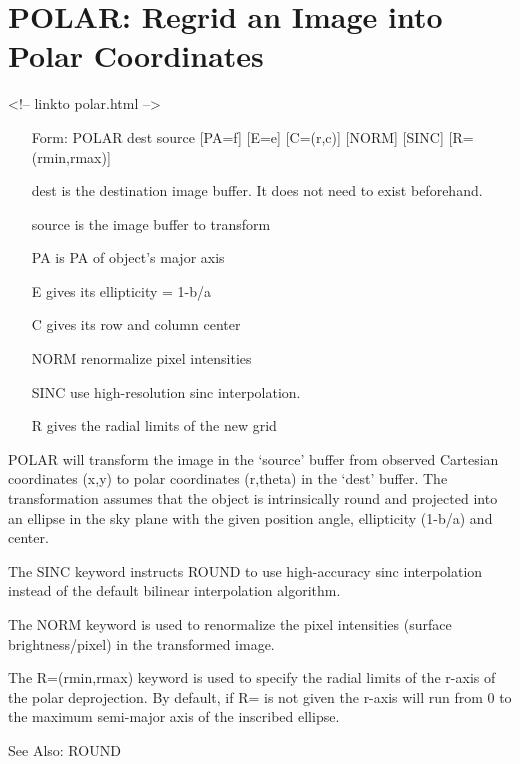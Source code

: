 \section{POLAR: Regrid an Image into Polar Coordinates}
\begin{rawhtml}
<!-- linkto polar.html -->
\end{rawhtml}
\begin{itemize}
  \item[Form: POLAR dest source {[PA=f]} {[E=e]} {[C=(r,c)]} {[NORM]} 
       {[SINC]} {[R=(rmin,rmax)]}\hfill]{}
  \item[dest]{is the destination image buffer. It does not need
       to exist beforehand.}
  \item[source]{is the image buffer to transform}
  \item[PA]{is PA of object's major axis}
  \item[E]{gives its ellipticity = 1-b/a}
  \item[C]{gives its row and column center}
  \item[NORM]{renormalize pixel intensities}
  \item[SINC]{use high-resolution sinc interpolation.}
  \item[R]{gives the radial limits of the new grid}
\end{itemize}

POLAR will transform the image in the `source' buffer from observed
Cartesian coordinates (x,y) to polar coordinates (r,theta) in the `dest'
buffer.  The transformation assumes that the object is intrinsically round
and projected into an ellipse in the sky plane with the given position
angle, ellipticity (1-b/a) and center.

The SINC keyword instructs ROUND to use high-accuracy sinc interpolation
instead of the default bilinear interpolation algorithm.  

The NORM keyword is used to renormalize the pixel intensities (surface
brightness/pixel) in the transformed image.

The R=(rmin,rmax) keyword is used to specify the radial limits of the
r-axis of the polar deprojection.  By default, if R= is not given the
r-axis will run from 0 to the maximum semi-major axis of the inscribed
ellipse.

See Also: ROUND


